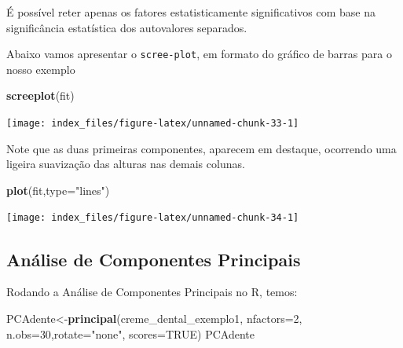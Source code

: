 \documentclass[12pt,brazil,oneside]{book}
\newenvironment{Shaded}{\begin{snugshade}}{\end{snugshade}}
\newcommand{\DataTypeTok}[1]{\textcolor[rgb]{0.13,0.29,0.53}{#1}}
\newcommand{\DecValTok}[1]{\textcolor[rgb]{0.00,0.00,0.81}{#1}}
\newcommand{\KeywordTok}[1]{\textcolor[rgb]{0.13,0.29,0.53}{\textbf{#1}}}
\newcommand{\NormalTok}[1]{#1}
\newcommand{\OtherTok}[1]{\textcolor[rgb]{0.56,0.35,0.01}{#1}}
\newcommand{\StringTok}[1]{\textcolor[rgb]{0.31,0.60,0.02}{#1}}
\begin{document}
É possível reter apenas os fatores estatisticamente significativos com base na significância estatística dos autovalores separados.

Abaixo vamos apresentar o \texttt{scree-plot}, em formato do gráfico de barras para o nosso exemplo

\begin{Shaded}
\begin{Highlighting}[]
\KeywordTok{screeplot}\NormalTok{(fit)}
\end{Highlighting}
\end{Shaded}

\begin{center}\texttt{[image: index\_files/figure-latex/unnamed-chunk-33-1]} \end{center}

Note que as duas primeiras componentes, aparecem em destaque, ocorrendo uma ligeira suavização das alturas nas demais colunas.

\begin{Shaded}
\begin{Highlighting}[]
\KeywordTok{plot}\NormalTok{(fit,}\DataTypeTok{type=}\StringTok{"lines"}\NormalTok{)}
\end{Highlighting}
\end{Shaded}

\begin{center}\texttt{[image: index\_files/figure-latex/unnamed-chunk-34-1]} \end{center}

\hypertarget{analise-de-componentes-principais}{%
\subsection{Análise de Componentes Principais}\label{analise-de-componentes-principais}}

Rodando a Análise de Componentes Principais no R, temos:

\begin{Shaded}
\begin{Highlighting}[]
\NormalTok{PCAdente<-}\KeywordTok{principal}\NormalTok{(creme_dental_exemplo1, }\DataTypeTok{nfactors=}\DecValTok{2}\NormalTok{,}
                \DataTypeTok{n.obs=}\DecValTok{30}\NormalTok{,}\DataTypeTok{rotate=}\StringTok{"none"}\NormalTok{, }\DataTypeTok{scores=}\OtherTok{TRUE}\NormalTok{)}
\NormalTok{PCAdente}
\end{Highlighting}
\end{Shaded}
\end{document}
